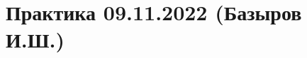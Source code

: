 \documentclass[main.tex]{subfiles}
\begin{document}

\section{Практика 09.11.2022 (Базыров И.Ш.)}
\end{document}
